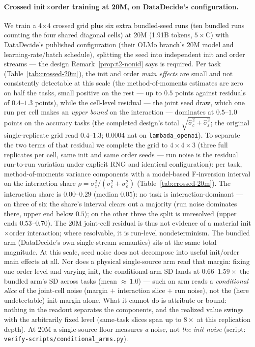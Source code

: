 \paragraph{Crossed init$\times$order training at 20M, on DataDecide's configuration.}
We train a 4$\times$4 crossed grid plus six extra bundled-seed runs (ten bundled runs counting the four shared diagonal cells) at 20M (1.91B tokens,
$5\times$C) with DataDecide's published configuration (their OLMo branch's 20M model and
learning-rate/batch schedule), splitting the seed into independent init and order streams ---
the design Remark~\ref{prop:t2-nonid} says is required. Per task
(Table~\ref{tab:crossed-20m}), the init and order \emph{main effects} are small and not
consistently detectable at this scale (the method-of-moments estimates are zero on half the
tasks, small positive on the rest --- up to $0.5$ points against residuals of $0.4$--$1.3$ points), while the cell-level residual ---
the joint seed draw, which one run per cell makes an \emph{upper bound} on the interaction ---
dominates at $0.5$--$1.0$ points on the accuracy tasks (the completed design's total
$\sqrt{\hat\sigma_c^2 + \hat\sigma_\varepsilon^2}$; the original single-replicate grid read $0.4$--$1.3$;
$0.0004$ nat on \texttt{lambada\_openai}). To separate the two terms of that residual we complete the
grid to $4{\times}4{\times}3$ (three full replicates per cell, same init and same order
seeds --- run noise is the residual run-to-run variation under explicit RNG and identical
configuration): per task, method-of-moments variance components with a model-based
F-inversion interval on the interaction share $\rho = \sigma_c^2/(\sigma_c^2 +
\sigma_\varepsilon^2)$ (Table~\ref{tab:crossed-20m}). The interaction share is $0.00$--$0.29$
(median $0.05$): no task is interaction-dominant --- on three of six the share's interval
clears out a majority (run noise dominates there, upper end below $0.5$); on the other three
the split is unresolved (upper ends $0.53$--$0.70$). The 20M joint-cell residual is thus not evidence of a
material init$\times$order interaction; where resolvable, it is run-level nondeterminism. The bundled arm (DataDecide's own single-stream
semantics) sits at the same total magnitude. At this scale, seed noise does not decompose into
useful init/order main effects at all. Nor does a physical single-source arm read that
margin: fixing one order level and varying init, the conditional-arm SD lands at
$0.66$--$1.59\times$ the bundled arm's SD across tasks (mean ${\approx}\,1.0$) --- such an
arm reads a \emph{conditional slice} of the joint-cell noise (margin $+$ interaction slice
$+$ run noise), not the (here undetectable) init margin alone. What it cannot do is attribute or bound: nothing
in the readout separates the components, and the realized value swings with the arbitrarily
fixed level (same-task slices span up to $8\times$ at this replication depth). At 20M a
single-source floor measures \emph{a} noise, not \emph{the init noise} (script:
\texttt{verify-scripts/conditional\_arms.py}).


